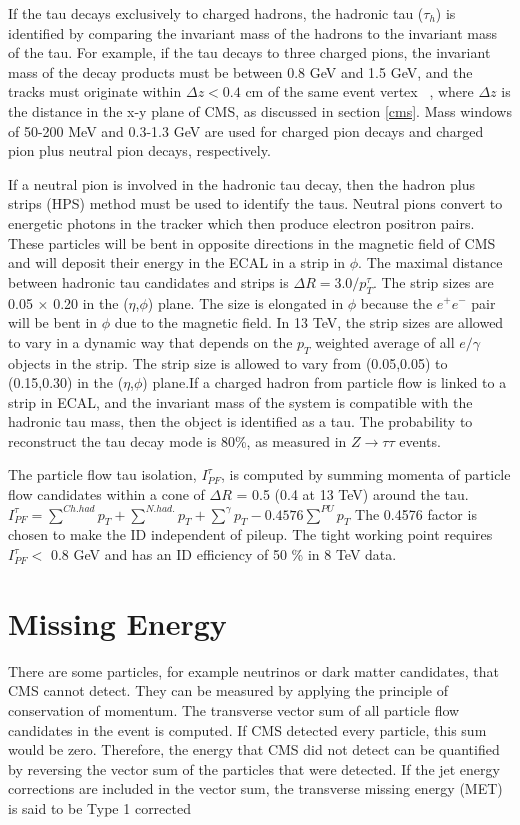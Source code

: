\documentclass[oneside, letterpaper, oldfontcommands]{memoir}
\begin{document}
\qquad If the tau decays exclusively to charged hadrons, the hadronic tau ($\tau_{h}$) is identified by comparing the invariant mass of the hadrons to the invariant mass of the tau. For example, if the tau decays to three charged pions, the invariant mass of the decay products must be between 0.8 GeV and 1.5 GeV, and the tracks must originate within $\Delta z < 0.4$ cm of the same event vertex ~\cite{1748-0221-7-01-P01001}, where $\Delta z$ is the distance in the x-y plane of CMS, as discussed in section \ref{cms}. Mass windows of 50-200 MeV and 0.3-1.3 GeV are used for charged pion decays and charged pion plus neutral pion decays, respectively. 

\qquad If a neutral pion is involved in the hadronic tau decay, then the hadron plus strips (HPS) method must be used to identify the taus. Neutral pions convert to energetic photons in the tracker which then produce electron positron pairs. These particles will be bent in opposite directions in the magnetic field of CMS and will deposit their energy in the ECAL in a strip in $\phi$. The maximal distance between hadronic tau candidates and strips is $\Delta R = 3.0/p_{T}^{\tau}$. The strip sizes are 0.05 $\times$ 0.20 in the ($\eta$,$\phi$) plane. The size is elongated in $\phi$ because the $e^{+}e^{-}$ pair will be bent in $\phi$ due to the magnetic field. In 13 TeV, the strip sizes are allowed to vary in a dynamic way that depends on the $p_{T}$ weighted average of all $e/ \gamma$ objects in the strip. The strip size is allowed to vary from (0.05,0.05) to (0.15,0.30) in the ($\eta$,$\phi$) plane.If a charged hadron from particle flow is linked to a strip in ECAL, and the invariant mass of the system is compatible with the hadronic tau mass, then the object is identified as a tau. The probability to reconstruct the tau decay mode is 80\%, as measured in $Z \rightarrow \tau\tau$ events.

\qquad The particle flow tau isolation, $I_{PF}^{\tau}$, is computed by summing momenta of particle flow candidates within a cone of $\Delta R$ = 0.5 (0.4 at 13 TeV) around the tau. $I_{PF}^{\tau} =  \sum\limits^{Ch. had} p_{T} + \sum\limits^{N. had.} p_{T} + \sum\limits^{\gamma} p_{T} - 0.4576 \sum\limits^{PU} p_{T}$ The 0.4576 factor is chosen to make the ID independent of pileup. The tight working point requires $I_{PF}^{\tau} <$ 0.8 GeV and has an ID efficiency of 50 \% in 8 TeV data. \cite{CMS-DP-2014-015}

\section{Missing Energy} \label{met}
\qquad There are some particles, for example neutrinos or dark matter candidates, that CMS cannot detect. They can be measured by applying the principle of conservation of momentum. The transverse vector sum of all particle flow candidates in the event is computed. If CMS detected every particle, this sum would be zero. Therefore, the energy that CMS did not detect can be quantified by reversing the vector sum of the particles that were detected. If the jet energy corrections are included in the vector sum, the transverse missing energy (MET) is said to be Type 1 corrected ~\cite{Khachatryan:2014gga}
\end{document}
